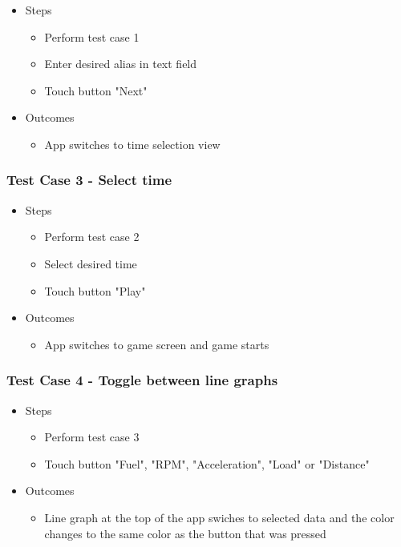 \documentclass{article}
\begin{document}
\begin{itemize}
\item Steps
\begin{itemize}
\item Perform test case 1
\item Enter desired alias in text field
\item Touch button "Next"
\end{itemize}
\item Outcomes
\begin{itemize}
\item App switches to time selection view
\end{itemize}
\end{itemize}

\subsubsection*{Test Case 3 - Select time}

\begin{itemize}
\item Steps
\begin{itemize}
\item Perform test case 2
\item Select desired time
\item Touch button "Play"
\end{itemize}
\item Outcomes
\begin{itemize}
\item App switches to game screen and game starts
\end{itemize}
\end{itemize}

\subsubsection*{Test Case 4 - Toggle between line graphs}

\begin{itemize}
\item Steps
\begin{itemize}
\item Perform test case 3
\item Touch button "Fuel", "RPM", "Acceleration", "Load" or "Distance"
\end{itemize}
\item Outcomes
\begin{itemize}
\item Line graph at the top of the app swiches to selected data and the color changes to the same color as the button that was pressed
\end{itemize}
\end{itemize}
\end{document}

